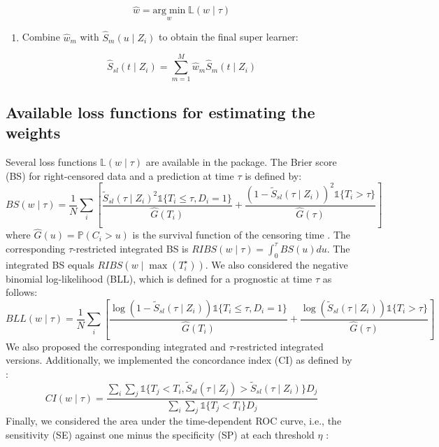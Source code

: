 \[\hat{w} = \underset{w}{\mathrm{arg \; min}} \; \mathbb{L} (w \mid \tau)\]

\begin{enumerate}
\def\labelenumi{\arabic{enumi}.}
\setcounter{enumi}{8}
\tightlist
\item
  Combine \(\hat{w}_m\) with \(\hat{S}_m(u \mid Z_i)\) to obtain the final super learner:
\end{enumerate}

\[\hat{S}_{sl}(t \mid Z_i) = \sum_{m=1}^M \hat{w}_m \hat{S}_m(t \mid Z_i)\]

\hypertarget{available-loss-functions-for-estimating-the-weights}{%
\subsection{Available loss functions for estimating the weights}\label{available-loss-functions-for-estimating-the-weights}}

Several loss functions \(\mathbb{L} (w \mid \tau)\) are available in the package. The Brier score (BS) for right-censored data and a prediction at time \(\tau\) is defined by:
\[BS(w \mid \tau) = \frac{1}{N}  \sum_{i} \left [ \frac{ \tilde{S}_{sl}( \tau \mid Z_i)^2 \mathbb{1} \lbrace T_i \leq \tau, D_i=1  \rbrace  }{ \hat{G}(T_i) } +   \frac{ ( 1-\tilde{S}_{sl}( \tau \mid Z_i))^2 \mathbb{1} \lbrace T_i>\tau  \rbrace } { \hat{G}(\tau) } \right ]\]
where \(\hat{G}(u)=\mathbb{P}(C_i > u)\) is the survival function of the censoring time \citep{houwelingenDynamicPredictionClinical2012a}. The corresponding \(\tau\)-restricted integrated BS is \(RIBS(w \mid \tau) = \int_0^{\tau} BS(u) du\). The integrated BS equals \(RIBS(w \mid \max(T_i^\star))\). We also considered the negative binomial log-likelihood (BLL), which is defined for a prognostic at time \(\tau\) as follows:
\[BLL(w \mid \tau) = \frac{1}{N} \sum_{i} \left[  \frac{ \log (1-\tilde{S}_{sl}( \tau \mid Z_i) ) \mathbb{1} \lbrace T_i \leq \tau,D_i=1 \rbrace } {\hat{G}(T_i)} + \frac{ \log ( \tilde{S}_{sl}( \tau \mid Z_i) ) \mathbb{1} \lbrace T_i>\tau \rbrace } { \hat{G}(\tau) }\right]\]
We also proposed the corresponding integrated and \(\tau\)-restricted integrated versions. Additionally, we implemented the concordance index (CI) as defined by \citet{uno_c-statistics_2011}:
\[CI(w \mid \tau) = \frac{\sum_{i}\sum_{j} \mathbb{1} \lbrace T_j < T_i , \tilde{S}_{sl}( \tau \mid Z_j) > \tilde{S}_{sl}( \tau \mid Z_i)  \rbrace D_j}{ \sum_{i}\sum_{j} \mathbb{1} \lbrace T_j < T_i \rbrace D_j }\]
Finally, we considered the area under the time-dependent ROC curve, i.e., the sensitivity (SE) against one minus the specificity (SP) at each threshold \(\eta\) \citep{hung_estimation_2010}:

